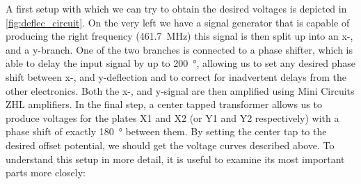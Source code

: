 A first setup with which we can try to obtain the desired voltages is depicted in \cref{fig:deflec_circuit}. On the  very left we have a signal generator that is capable of producing the right frequency (\SI{461.7}{\mega\hertz}) this signal is then split up into an x-, and a y-branch. One of the two branches is connected to a phase shifter, which is able to delay the input signal by up to \SI{200}{\degree}, allowing us to set any desired phase shift between x-, and y-deflection and to correct for inadvertent delays from the other electronics. Both the x-, and  y-signal are then amplified using Mini Circuits ZHL amplifiers. In the final step, a center tapped transformer allows us to produce voltages for the plates X1 and X2 (or Y1 and Y2 respectively) with a phase shift of exactly \SI{180}{\degree} between them. By setting the center tap to the desired offset potential, we should get the voltage curves described above. To understand this setup in more detail, it is useful to examine its most important parts more closely:

